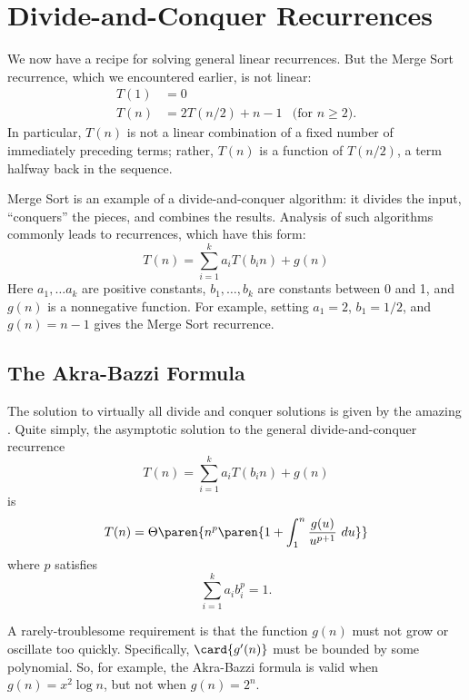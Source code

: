 \begin{figure}[p]
\end{figure}

\section{Divide-and-Conquer Recurrences}

We now have a recipe for solving general linear recurrences.  But the
Merge Sort recurrence, which we encountered earlier, is not linear:
\begin{align*}
T(1) & = 0 \\
T(n) & = 2 T(n/2) + n - 1 & \text{(for $n \geq 2$)}.
\end{align*}
In particular, $T(n)$ is not a linear combination of a fixed number of
immediately preceding terms; rather, $T(n)$ is a function of $T(n/2)$,
a term halfway back in the sequence.

Merge Sort is an example of a divide-and-conquer algorithm: it divides
the input, ``conquers'' the pieces, and combines the results.
Analysis of such algorithms commonly leads to 
recurrences, which have this form:
\[
T(n) =  \sum_{i=1}^k a_i T(b_i n) + g(n)
\]
Here $a_1, \dots a_k$ are positive constants, $b_1, \dots, b_k$ are
constants between 0 and 1, and $g(n)$ is a nonnegative function.  For
example, setting $a_1 = 2$, $b_1 = 1/2$, and $g(n) = n - 1$ gives the
Merge Sort recurrence.

\subsection{The Akra-Bazzi Formula}

The solution to virtually all divide and conquer solutions is given by
the amazing .  Quite simply, the asymptotic
solution to the general divide-and-conquer recurrence
\[
T(n) = \sum_{i=1}^k a_i T(b_i n) + g(n)
\]
is
\begin{equation}\label{eqn:10C1}
T(n) = \Theta\paren{n^p \paren{1 + \int_1^n \frac{g(u)}{u^{p+1}}\ du}}
\end{equation}
where $p$ satisfies
\begin{equation}\label{eqn:10C2}
\sum_{i=1}^k {a_i b_i^p} = 1.
\end{equation}

A rarely-troublesome requirement is that the function $g(n)$ must not
grow or oscillate too quickly.  Specifically, $\card{g'(n)}$ must be
bounded by some polynomial.  So, for example, the Akra-Bazzi formula
is valid when $g(n) = x^2 \log n$, but not when $g(n) = 2^n$.

